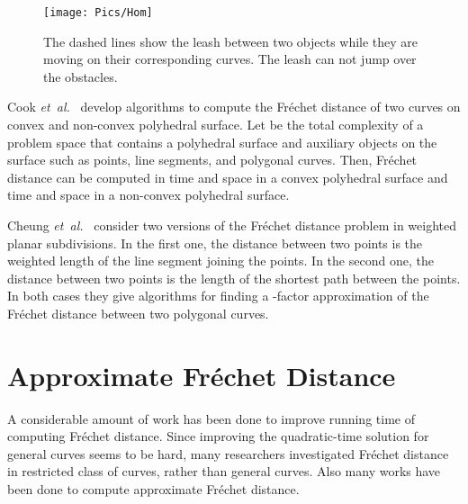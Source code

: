 \documentclass[12pt]{dalthesis}
\newcommand{\etal}{{\em et~al.\/}}
\newcommand{\Frechet}{Fr\'echet }
\begin{document}
\begin{figure}[t]
	\centering
	\texttt{[image: Pics/Hom]}
	\caption{The dashed lines show the leash between two objects 
	while they are moving on their corresponding curves. 
	The leash can not jump over the obstacles.}
	\label{fig:Hom}
\end{figure}












Cook \etal~\cite{Cook2009} develop algorithms to compute the \Frechet distance of 
two curves  on convex and non-convex polyhedral surface.
Let  be the total complexity of a problem space that contains
a polyhedral surface and auxiliary objects on the surface such as points,
line segments, and polygonal curves.
Then, \Frechet distance can be computed in  time and  space in a convex polyhedral surface and 
 time and  space in a non-convex polyhedral surface.

Cheung \etal~\cite{Cheung2009} consider two versions of 
the \Frechet distance problem in weighted planar subdivisions. In the first one, the distance between two points is the weighted length of the line segment joining the points. In the second one, the distance between two points is the length of the shortest path between the points. In both cases they give algorithms for finding a -factor approximation of the \Frechet distance between two polygonal curves. 


\section{Approximate \Frechet Distance}
A considerable amount of work 
has been done to improve running time
of computing \Frechet distance. 
Since improving the quadratic-time solution for general curves seems
to be hard, many researchers investigated \Frechet distance in restricted class 
of curves, rather than general curves. 
Also many works have been done 
to compute approximate \Frechet distance. 
\end{document}

